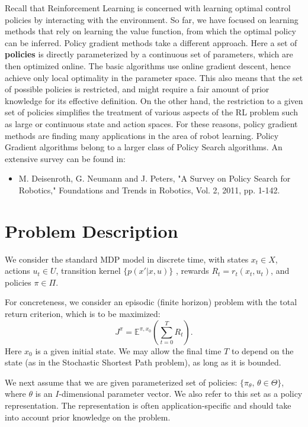 Recall that Reinforcement Learning is concerned with learning optimal control policies by interacting with the environment. So far, we have focused on learning methods that rely on learning the value function, from which the optimal policy can be inferred.
Policy gradient methods take a different approach. Here a set of \textbf{policies} is directly parameterized by a continuous set of parameters, which are then optimized online. The basic algorithms use online gradient descent, hence achieve only local optimality in the parameter space.
This also means that the set of possible policies is restricted, and might require a fair amount of prior knowledge for its effective definition. On the other hand, the restriction to a given set of policies simplifies the treatment of various aspects of the RL problem such as large or continuous state and action spaces. For these reasons, policy gradient methods are finding many applications in the area of robot learning.
Policy Gradient algorithms belong to a larger class of Policy Search algorithms. An extensive survey can be found in:
\begin{itemize}
  \item M. Deisenroth, G. Neumann and J. Peters, "A Survey on Policy Search for Robotics," Foundations and Trends in Robotics, Vol. 2, 2011, pp. 1-142.
\end{itemize}
%

\section{Problem Description}

We consider the standard MDP model in discrete time, with states  ${x_t} \in X$, actions ${u_t} \in U$, transition kernel $\{ p(x'|x,u)\} $ , rewards  ${R_t} = {r_t}({x_t},{u_t})$, and policies $\pi  \in \Pi $.

For concreteness, we consider an episodic (finite horizon) problem with the total return criterion, which is to be maximized:
\[{J^\pi } = {\mathbb E^{\pi ,{x_0}}}\left(\sum\limits_{t = 0}^T {{R_t}} \right).\]
Here ${x_0}$ is a given initial state. We may allow the final time $T$ to depend on the state (as in the Stochastic Shortest Path problem), as long as it is bounded.

We next assume that we are given parameterized set of policies: $\{ {\pi _\theta },\,\theta  \in \Theta \} $, where $\theta $ is an $I$-dimensional parameter vector. We also refer to this set as a policy representation. The representation is often application-specific and should take into account prior knowledge on the problem.

